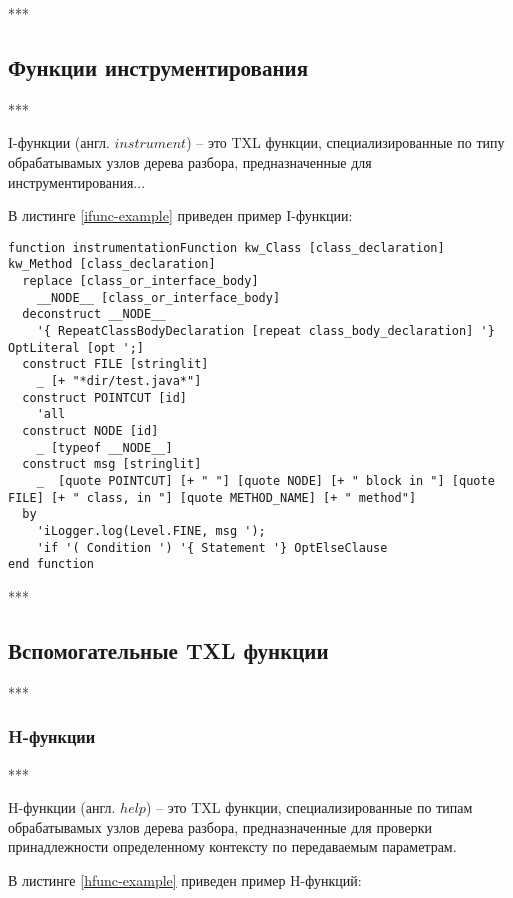 ***

\subsection{Функции инструментирования}

***

I-функции (англ. $instrument$) -- это TXL функции, специализированные по типу обрабатывамых узлов дерева разбора, предназначенные для инструментирования...

В листинге \ref{ifunc-example} приведен пример I-функции:

\begin{lstlisting}[frame=single, language=TXL, label={ifunc-example}, caption={Пример I-функции}]
function instrumentationFunction kw_Class [class_declaration] kw_Method [class_declaration]
  replace [class_or_interface_body]
    __NODE__ [class_or_interface_body]
  deconstruct __NODE__
    '{ RepeatClassBodyDeclaration [repeat class_body_declaration] '} OptLiteral [opt ';]
  construct FILE [stringlit]
    _ [+ "*dir/test.java*"]
  construct POINTCUT [id]
    'all
  construct NODE [id]
    _ [typeof __NODE__]
  construct msg [stringlit]
    _  [quote POINTCUT] [+ " "] [quote NODE] [+ " block in "] [quote FILE] [+ " class, in "] [quote METHOD_NAME] [+ " method"]
  by
    'iLogger.log(Level.FINE, msg ');
    'if '( Condition ') '{ Statement '} OptElseClause
end function
\end{lstlisting}

***

\subsection{Вспомогательные TXL функции}

***

\subsubsection{H-функции}

***

H-функции (англ. $help$) -- это TXL функции, специализированные по типам обрабатывамых узлов дерева разбора, предназначенные для проверки принадлежности определенному контексту по передаваемым параметрам.

В листинге \ref{hfunc-example} приведен пример H-функций:

